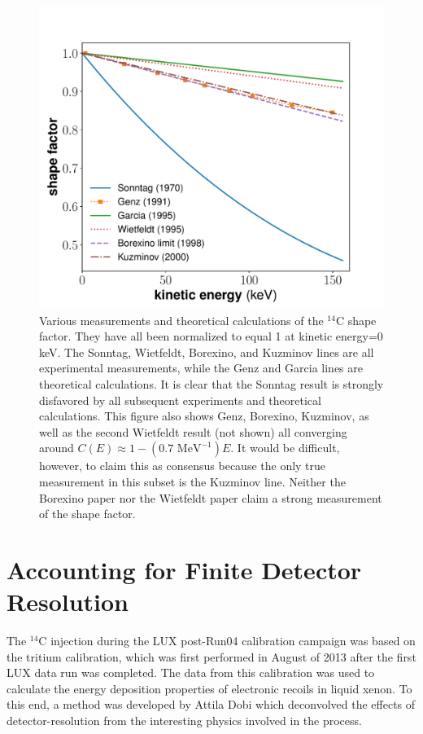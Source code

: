 \begin{figure}[h!]
\centering
\includegraphics[width=\textwidth]{Figures/ShapeFac_compare.pdf}
\caption{Various measurements and theoretical calculations of the $^{14}$C shape factor. They have all been normalized to equal 1 at kinetic energy=0 keV. The Sonntag\cite{C14_Sonntag}, Wietfeldt\cite{C14_Wietfeldt}, Borexino\cite{C14_Borexino}, and Kuzminov\cite{C14_Kuzminov} lines are all experimental measurements, while the Genz\cite{C14_Genz} and Garcia\cite{C14_Garcia} lines are theoretical calculations. It is clear that the Sonntag result is strongly disfavored by all subsequent experiments and theoretical calculations. This figure also shows Genz, Borexino, Kuzminov, as well as the second Wietfeldt result (not shown) all converging around $C(E)\approx 1-(0.7 \text{ \ MeV}^{-1})E$. It would be difficult, however, to claim this as consensus because the only true measurement in this subset is the Kuzminov line. Neither the Borexino paper nor the Wietfeldt paper claim a strong measurement of the shape factor.} 
\label{fig:C14_shape}
\end{figure}



\section{Accounting for Finite Detector Resolution}\label{sec:desmearing}
The $^{14}$C injection during the LUX post-Run04 calibration campaign was based on the tritium calibration, which was first performed in August of 2013 after the first LUX data run was completed. The data from this calibration was used to calculate the energy deposition properties of electronic recoils in liquid xenon. To this end, a method was developed by Attila Dobi which deconvolved the effects of detector-resolution from the interesting physics involved in the process\cite{lux_tritium,attila}. 


